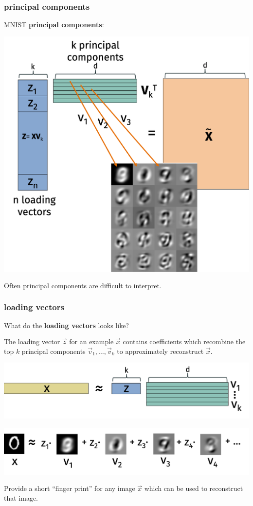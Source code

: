 \documentclass[handout,compress]{beamer}
\begin{document}
\begin{frame}[t]
	\frametitle{principal components}
	\begin{center}
		\vspace{-.5em}
		MNIST \textbf{principal components}: 
		
		\includegraphics[width=.6\textwidth]{pc_visualization.png}
		
			Often principal components are difficult to interpret.
	\end{center}
\end{frame}

\begin{frame}[t]
	\frametitle{loading vectors}
	\small
	\begin{center}
			What do the \textbf{loading vectors} looks like? 
		
		The loading vector $\vec{z}$ for an example $\vec{x}$ contains coefficients which recombine the top $k$ principal components $\vec{v}_1, \ldots, \vec{v}_k$ to approximately reconstruct $\vec{x}$. 
		
		\includegraphics[width=.8\textwidth]{loading_diag.png}

\includegraphics[width=.8\textwidth]{loadingexamp.png}

Provide a short ``finger print'' for any image $\vec{x}$ which can be used to reconstruct that image. 
	\end{center}
\end{frame}
\end{document}
